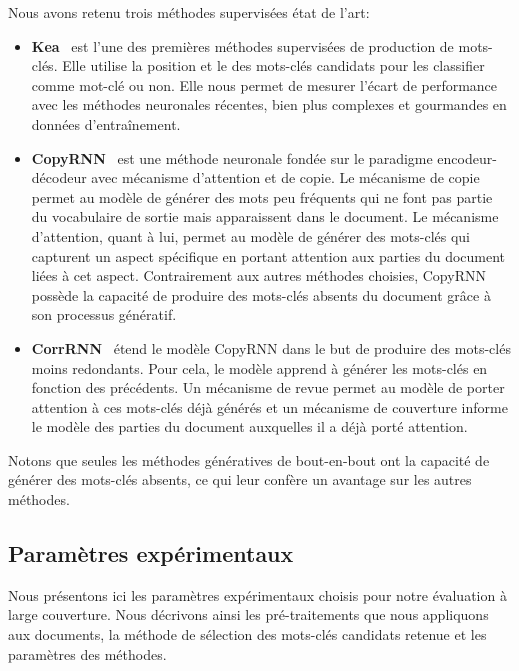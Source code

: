 Nous avons retenu trois méthodes supervisées état de l'art:
\begin{itemize}
    \item\textbf{Kea}~\cite{witten_kea:_1999} est l'une des premières méthodes supervisées de production de mots-clés.
    Elle utilise la position et le \tfidf{} des mots-clés candidats pour les classifier comme mot-clé ou non.
    Elle nous permet de mesurer l'écart de performance avec les méthodes neuronales récentes, bien plus complexes et gourmandes en données d'entraînement.
    \item\textbf{CopyRNN}~\cite{meng_deep_2017} est une méthode neuronale fondée sur le paradigme encodeur-décodeur avec mécanisme d'attention et de copie.
    Le mécanisme de copie permet au modèle de générer des mots peu fréquents qui ne font pas partie du vocabulaire de sortie mais apparaissent dans le document.
    Le mécanisme d'attention, quant à lui, permet au modèle de générer des mots-clés qui capturent un aspect spécifique en portant attention aux parties du document liées à cet aspect.
    Contrairement aux autres méthodes choisies, CopyRNN possède la capacité de produire des mots-clés absents du document grâce à son processus génératif.
    \item \textbf{CorrRNN}~\cite{chen_keyphrase_2018} étend le modèle CopyRNN dans le but de produire des mots-clés moins redondants.
    Pour cela, le modèle apprend à générer les mots-clés en fonction des précédents.
    Un mécanisme de revue permet au modèle de porter attention à ces mots-clés déjà générés et un mécanisme de couverture informe le modèle des parties du document auxquelles il a déjà porté attention.

\end{itemize}

Notons que seules les méthodes génératives de bout-en-bout ont la capacité de générer des mots-clés absents, ce qui leur confère un avantage sur les autres méthodes.



\subsection{Paramètres expérimentaux}

Nous présentons ici les paramètres expérimentaux choisis pour notre évaluation à large couverture.
Nous décrivons ainsi les pré-traitements que nous appliquons aux documents, la méthode de sélection des mots-clés candidats retenue et les paramètres des méthodes.

